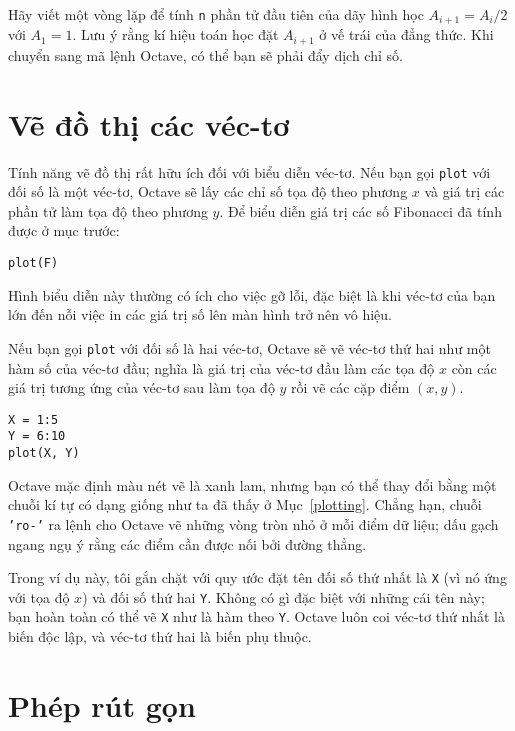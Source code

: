 \documentclass[12pt]{book}
\begin{document}
\begin{ex}
Hãy viết một vòng lặp để tính {\tt n} phần tử đầu tiên của
dãy hình học $A_{i+1} = A_i/2$ với $A_1 = 1$. Lưu ý rằng
kí hiệu toán học đặt $A_{i+1}$ ở vế trái của đẳng thức.
Khi chuyển sang mã lệnh Octave, có thể bạn sẽ phải đẩy dịch
chỉ số.
\end{ex}


\section{Vẽ đồ thị các véc-tơ}

Tính năng vẽ đồ thị rất hữu ích đối với biểu diễn véc-tơ. Nếu bạn
gọi {\tt plot} với đối số là một véc-tơ, Octave sẽ lấy các 
chỉ số tọa độ theo phương $x$ và giá trị các phần tử làm tọa độ
theo phương $y$. Để biểu diễn giá trị các số Fibonacci đã tính được ở
mục trước:

\begin{verbatim}
plot(F)
\end{verbatim}
%
Hình biểu diễn này thường có ích cho việc gỡ lỗi, đặc biệt là khi
véc-tơ của bạn lớn đến nỗi việc in các giá trị số lên màn hình
trở nên vô hiệu.

Nếu bạn gọi {\tt plot} với đối số là hai véc-tơ, Octave sẽ 
vẽ véc-tơ thứ hai như một hàm số của véc-tơ đầu; nghĩa là 
giá trị của véc-tơ đầu làm các tọa độ $x$ còn các giá trị tương ứng
của véc-tơ sau làm tọa độ $y$ rồi vẽ các cặp điểm $(x, y)$.

\begin{verbatim}
X = 1:5
Y = 6:10
plot(X, Y)
\end{verbatim}
%
Octave mặc định màu nét vẽ là xanh lam, nhưng bạn có thể thay đổi
bằng một chuỗi kí tự có dạng giống như ta đã thấy ở Mục~\ref{plotting}.
Chẳng hạn, chuỗi {\tt 'ro-'} ra lệnh cho Octave vẽ những vòng tròn nhỏ
ở mỗi điểm dữ liệu; dấu gạch ngang ngụ ý rằng các điểm cần được nối
bởi đường thẳng.

Trong ví dụ này, tôi gắn chặt với quy ước đặt tên đối số thứ nhất
là {\tt X} (vì nó ứng với tọa độ $x$) và đối số thứ hai {\tt Y}.
Không có gì đặc biệt với những cái tên này; bạn hoàn toàn
có thể vẽ {\tt X} như là hàm theo {\tt Y}. Octave luôn coi 
véc-tơ thứ nhất là biến độc lập, và véc-tơ thứ hai là biến phụ thuộc.



\section{Phép rút gọn}
\label{reduce}
\end{document}
